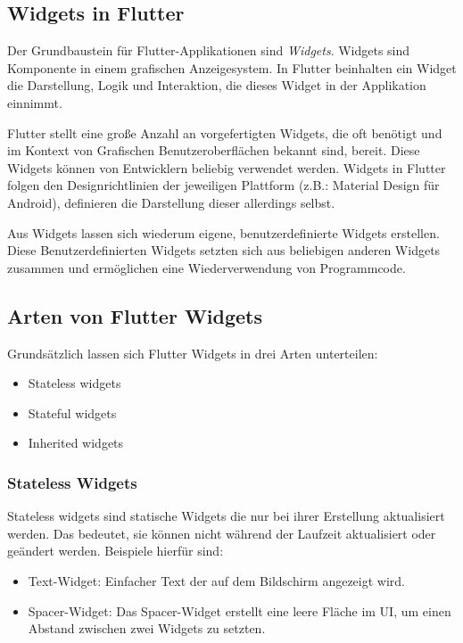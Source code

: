 \subsection{Widgets in Flutter}
Der Grundbaustein für Flutter-Applikationen sind \textit{Widgets}.
Widgets sind Komponente in einem grafischen Anzeigesystem. 
In Flutter beinhalten ein Widget die Darstellung, Logik und Interaktion, die dieses Widget in der Applikation einnimmt.


Flutter stellt eine große Anzahl an vorgefertigten Widgets, die oft benötigt und im Kontext von Grafischen
Benutzeroberflächen bekannt sind, bereit. Diese Widgets können von Entwicklern beliebig verwendet werden.
Widgets in Flutter folgen den Designrichtlinien der jeweiligen Plattform (z.B.: Material Design für Android), 
definieren die Darstellung dieser allerdings selbst.

Aus Widgets lassen sich wiederum eigene, benutzerdefinierte Widgets erstellen.
Diese Benutzerdefinierten Widgets setzten sich aus beliebigen anderen Widgets zusammen 
und ermöglichen eine Wiederverwendung von Programmcode. \cite{flutterwikipediaDE}

\subsection{Arten von Flutter Widgets}
Grundsätzlich lassen sich Flutter Widgets in drei Arten unterteilen:
 \begin{itemize}
    \item Stateless widgets
    \item Stateful widgets
    \item Inherited widgets
 \end{itemize}

\subsubsection{Stateless Widgets}
Stateless widgets sind statische Widgets die nur bei ihrer Erstellung aktualisiert werden.
Das bedeutet, sie können nicht während der Laufzeit aktualisiert oder geändert werden. \cite{flutterstatelesswidgets}
Beispiele hierfür sind:
\begin{itemize}
    \item Text-Widget: Einfacher Text der auf dem Bildschirm angezeigt wird.
    \item Spacer-Widget: Das Spacer-Widget erstellt eine leere Fläche im UI,
    um einen Abstand zwischen zwei Widgets zu setzten.
\end{itemize}


